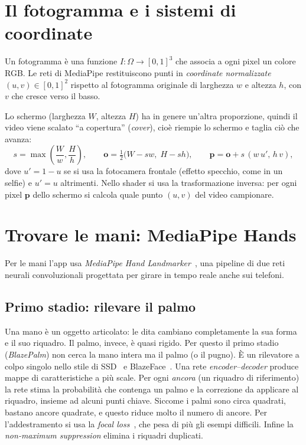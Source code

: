 \documentclass[11pt,a4paper]{article}
\newcommand{\vect}[1]{\mathbf{#1}}
\begin{document}
\section{Il fotogramma e i sistemi di coordinate}

Un fotogramma è una funzione $I:\Omega\to[0,1]^3$ che associa a ogni pixel un colore RGB. Le reti
di MediaPipe restituiscono punti in \emph{coordinate normalizzate} $(u,v)\in[0,1]^2$ rispetto al
fotogramma originale di larghezza $w$ e altezza $h$, con $v$ che cresce verso il basso.

Lo schermo (larghezza $W$, altezza $H$) ha in genere un'altra proporzione, quindi il video viene
scalato ``a copertura'' (\emph{cover}), cioè riempie lo schermo e taglia ciò che avanza:
\begin{equation}
  s=\max\!\left(\frac{W}{w},\frac{H}{h}\right),\qquad
  \vect{o}=\tfrac12\bigl(W-sw,\;H-sh\bigr),\qquad
  \vect{p}=\vect{o}+s\,(w\,u',\,h\,v),
\end{equation}
dove $u'=1-u$ se si usa la fotocamera frontale (effetto specchio, come in un selfie) e $u'=u$
altrimenti. Nello shader si usa la trasformazione inversa: per ogni pixel $\vect{p}$ dello
schermo si calcola quale punto $(u,v)$ del video campionare.

\section{Trovare le mani: MediaPipe Hands}

Per le mani l'app usa \emph{MediaPipe Hand Landmarker}~\cite{zhang2020hands,lugaresi2019mediapipe},
una pipeline di due reti neurali convoluzionali progettata per girare in tempo reale anche sui
telefoni.

\subsection{Primo stadio: rilevare il palmo}
Una mano è un oggetto articolato: le dita cambiano completamente la sua forma e il suo riquadro.
Il palmo, invece, è quasi rigido. Per questo il primo stadio (\emph{BlazePalm}) non cerca la mano
intera ma il palmo (o il pugno). È un rilevatore a colpo singolo nello stile di
SSD~\cite{liu2016ssd} e BlazeFace~\cite{bazarevsky2019blazeface}. Una rete
\emph{encoder--decoder} produce mappe di caratteristiche a più scale. Per ogni
\emph{ancora} (un riquadro di riferimento) la rete stima la probabilità che contenga un palmo
e la correzione da applicare al riquadro, insieme ad alcuni punti chiave. Siccome i palmi sono
circa quadrati, bastano ancore quadrate, e questo riduce molto il numero di ancore. Per
l'addestramento si usa la \emph{focal loss}~\cite{lin2017focal}, che pesa di più gli esempi
difficili. Infine la \emph{non-maximum suppression} elimina i riquadri duplicati.
\end{document}
